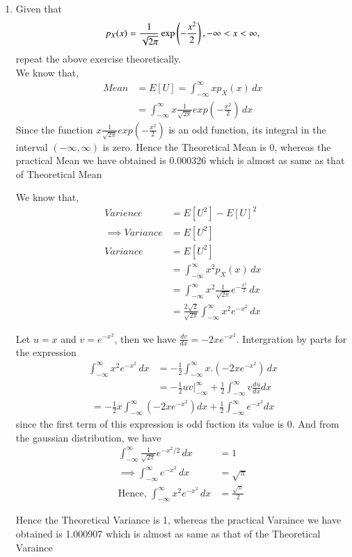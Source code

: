 \documentclass[journal,12pt,twocolumn]{article}
\renewcommand\thesection{\arabic{section}}
\begin{document}
\begin{enumerate}[label=\thesection.\arabic*
,ref=\thesection.\theenumi]
\item Given that 
\begin{align}
p_{X}(x) = \frac{1}{\sqrt{2\pi}}\exp\left(-\frac{x^2}{2}\right), -\infty < x < \infty,
\end{align}
repeat the above exercise theoretically.
%
\\
\solution
We know that,
\begin{align}
	Mean &= E[U] = \int_{-\infty}^{\infty} x p_X(x) \, dx\\
	&= \int_{-\infty}^{\infty} x \frac{1}{\sqrt{2\pi}}exp(-\frac{x^2}{2}) \, dx
\end{align}
Since the function $x \frac{1}{\sqrt{2\pi}}exp(-\frac{x^2}{2})$ is an odd function, its integral in the interval $(-\infty, \infty)$ is zero.
Hence the Theoretical Mean is 0, whereas the practical Mean we have obtained is 0.000326 which is almost as same as that of Theoretical Mean\newline

We know that,
\begin{align}
	Varience &= E[U^2] - E[U]^2 \\
	\implies Variance &= E[U^2] \\
	Variance &= E[U^2] \\
	&= \int_{-\infty}^{\infty} x^2 p_X(x) \, dx \\
	&= \int_{-\infty}^{\infty} x^2 \frac{1}{\sqrt{2\pi}}e^{-\frac{x^2}{2}} \,dx \\
	&= \frac{2\sqrt{2}}{\sqrt{2\pi}} \int_{-\infty}^{\infty} x^2 e^{-x^2} \, dx 
\end{align}

Let $u=x$ and $v = e^{-x^2}$, then we have $\frac{dv}{dx} = -2xe^{-x^2}$. Intergration by parts for the expression 
\begin{align} 
	\int_{-\infty}^{\infty} x^2 e^{-x^2} \, dx &= -\frac{1}{2} \int_{-\infty}^{\infty} x . (-2xe^{-x^2}) \, dx \\
	&= -\frac{1}{2}uv|_{-\infty}^{\infty} + \frac{1}{2} \int_{-\infty}^{\infty} v \frac{du}{dx}  dx 
\end{align}
\begin{align}
	= -\frac{1}{2}x \int_{-\infty}^{\infty}(-2xe^{-x^2}) dx +\frac{1}{2} \int_{-\infty}^{\infty} e^{-x^2}  dx 
\end{align}
since the first term of this expression is odd fuction its value is 0. And from the gaussian distribution, we have
\begin{align}
	\int_{-\infty}^{\infty} \frac{1}{\sqrt {2\pi}} e^{-x^2/2} \, dx &= 1 \\
	\implies \int_{-\infty}^{\infty} e^{-x^2} \, dx &= \sqrt{\pi} \\
	\text{Hence, } \int_{-\infty}^{\infty} x^2 e^{-x^2} \, dx &= \frac{\sqrt{\pi}}{2} 
\end{align}

Hence the Theoretical Variance is 1, whereas the practical Varaince we have obtained is 1.000907 which is almost as same as that of the Theoretical Varaince\newline

\end{enumerate}
\end{document}

